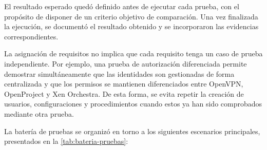 El resultado esperado quedó definido antes de ejecutar cada prueba, con el propósito de disponer de un criterio objetivo de comparación. Una vez finalizada la ejecución, se documentó el resultado obtenido y se incorporaron las evidencias correspondientes.

La asignación de requisitos no implica que cada requisito tenga un caso de prueba independiente. Por ejemplo, una prueba de autorización diferenciada permite demostrar simultáneamente que las identidades son gestionadas de forma centralizada y que los permisos se mantienen diferenciados entre OpenVPN, OpenProject y Xen Orchestra. De esta forma, se evita repetir la creación de usuarios, configuraciones y procedimientos cuando estos ya han sido comprobados mediante otra prueba.

La batería de pruebas se organizó en torno a los siguientes escenarios principales, presentados en la \autoref{tab:bateria-pruebas}:

\begingroup
\fontsize{8.5pt}{9.5pt}\selectfont
\renewcommand{\arraystretch}{1.3}
\setlength{\tabcolsep}{4pt}

